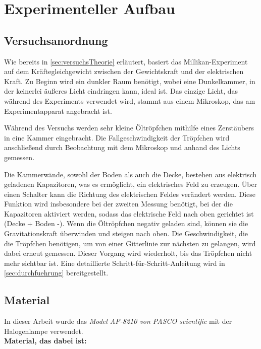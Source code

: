 \chapter{Experimenteller Aufbau}\label{cha:experimentAufbau}
\section{Versuchsanordnung}\label{sec:versuchsanordnung}

Wie bereits in \autoref{sec:versuchsTheorie} erläutert, basiert das Millikan-Experiment auf dem Kräftegleichgewicht zwischen der Gewichtskraft und der elektrischen Kraft. Zu Beginn wird ein dunkler Raum benötigt, wobei eine Dunkelkammer, in der keinerlei äußeres Licht eindringen kann, ideal ist. Das einzige Licht, das während des Experiments verwendet wird, stammt aus einem Mikroskop, das am Experimentapparat angebracht ist.

Während des Versuchs werden sehr kleine Öltröpfchen mithilfe eines Zerstäubers in eine Kammer eingebracht. Die Fallgeschwindigkeit der Tröpfchen wird anschließend durch Beobachtung mit dem Mikroskop und anhand des Lichts gemessen.

Die Kammerwände, sowohl der Boden als auch die Decke, bestehen aus elektrisch geladenen Kapazitoren, was es ermöglicht, ein elektrisches Feld zu erzeugen. Über einen Schalter kann die Richtung des elektrischen Feldes verändert werden. Diese Funktion wird insbesondere bei der zweiten Messung benötigt, bei der die Kapazitoren aktiviert werden, sodass das elektrische Feld nach oben gerichtet ist (Decke + Boden -). Wenn die Öltröpfchen negativ geladen sind, können sie die Gravitationskraft überwinden und steigen nach oben. Die Geschwindigkeit, die die Tröpfchen benötigen, um von einer Gitterlinie zur nächsten zu gelangen, wird dabei erneut gemessen. Dieser Vorgang wird wiederholt, bis das Tröpfchen nicht mehr sichtbar ist. Eine detaillierte Schritt-für-Schritt-Anleitung wird in \autoref{sec:durchfuehrung} bereitgestellt.

\section{Material}\label{sec:material}

In dieser Arbeit wurde das \textit{Model AP-8210 von PASCO scientific} mit der Halogenlampe verwendet. \\

\noindent \textbf{Material, das dabei ist:}

